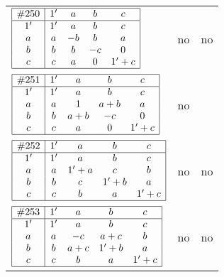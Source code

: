 \documentclass[12pt]{article}
\theoremstyle{definition}
\newcommand{\join}{\mathbin{+}}%
\newcommand{\id}{{1'}}%
\renewcommand{\top}{1}%
\begin{document}
\begin{center}
\begin{longtable}{l|c|c}
$
\begin{array}{|c|cccc|} \hline
\#250 & \id & a & b & c \\ \hline
\id & \id & a & b & c \\
a & a & -b & b & a \\
b & b & b & -c & 0 \\
c & c & a & 0 & \id \join c \\ \hline
\end{array}
$
 & no  
 & no      \\[15mm]

$
\begin{array}{|c|cccc|} \hline
\#251 & \id & a & b & c \\ \hline
\id & \id & a & b & c \\
a & a & \top & a \join b & a \\
b & b & a \join b & -c & 0 \\
c & c & a & 0 & \id \join c \\ \hline
\end{array}
$
 & no  
 & \adjustbox{valign=c, max height=1.6cm}{$
\left[ \begin{array}{ccccccc}
\id & a & a & b & a & b & a \\ 
a & \id & a & a & c & a & c \\ 
a & a & \id & b & a & b & a \\ 
b & a & b & \id & a & b & a \\ 
a & c & a & a & \id & a & c \\ 
b & a & b & b & a & \id & a \\ 
a & c & a & a & c & a & \id
\end{array}\right]
$}      \\[15mm]

$
\begin{array}{|c|cccc|} \hline
\#252 & \id & a & b & c \\ \hline
\id & \id & a & b & c \\
a & a & \id \join a & c & b \\
b & b & c & \id \join b & a \\
c & c & b & a & \id \join c \\ \hline
\end{array}
$
 & no  
 & no      \\[15mm]

$
\begin{array}{|c|cccc|} \hline
\#253 & \id & a & b & c \\ \hline
\id & \id & a & b & c \\
a & a & -c & a \join c & b \\
b & b & a \join c & \id \join b & a \\
c & c & b & a & \id \join c \\ \hline
\end{array}
$
 & no  
 & no      \\[15mm]


\end{longtable}
\end{center}
\end{document}
